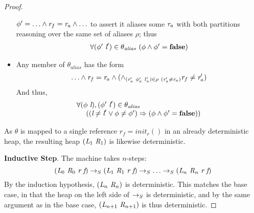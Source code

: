 \begin{proof}
\begin{itemize}
  $\phi^\prime = \ldots \wedge \emph{r}_f = \emph{r}_a \wedge \ldots$ to assert it aliases some
  $\emph{r}_a$ with both partitions reasoning over the same set
  of aliases $\rho$; thus
  \[\begin{array}{l}
     \forall (\phi^\prime\ \cfgnt{l}^\prime) \in \theta_\mathit{alias}\ (
     \phi \wedge \phi^\prime = \cfgt{false})
    \end{array}
  \]
\item Any member of $\theta_\mathit{alias}$ has the form
\[\ldots \wedge \cfgnt{r}_f = \cfgnt{r}_a \wedge ( \wedge_{( \cfgnt{r}^{\prime}_a\ \phi^{\prime}_a\ l^{\prime}_a)  \in \rho\ ( \cfgnt{r}^\prime_a \neq \cfgnt{r}_a) } \cfgnt{r}_f \neq \cfgnt{r}^{\prime}_a)\]
And thus, 
  \[\begin{array}{l}
     \forall (\phi\ \emph{l}),(\phi^\prime\ \emph{l}^\prime) \in \theta_\mathit{alias}\\
     \ \ \ \ ((\emph{l} \neq \emph{l}^\prime \vee \phi \neq \phi^\prime) \Rightarrow (\phi \wedge \phi^\prime = \textbf{false}))
     \end{array}
  \]
\end{itemize}
As $\theta$ is mapped to a single reference $r_f = \mathit{init}_r()$ in an already deterministic heap, the
resulting heap $(\emph{L}_1\ \emph{R}_1)$ is likewise deterministic.

\noindent\textbf{Inductive Step}. The machine takes $n$-steps:
\[
(\cfgnt{L}_0\ \cfgnt{R}_0\ \cfgnt{r}\ \cfgnt{f}) \rsum (\cfgnt{L}_1\ \cfgnt{R}_1\ \cfgnt{r}\ \cfgnt{f}) \rsum \ldots \rsum
(\cfgnt{L}_n\ \cfgnt{R}_n\ \cfgnt{r}\ \cfgnt{f})
\]
By the induction hypothesis, $(\cfgnt{L}_n\ \cfgnt{R}_n)$ is deterministic. This matches the base case, in that the heap on the
left side of $\rightarrow_S$ is deterministic, and by the
same argument as in the base case,
$(\emph{L}_{n+1}\ \emph{R}_{n+1})$ is thus deterministic.
\end{proof}

